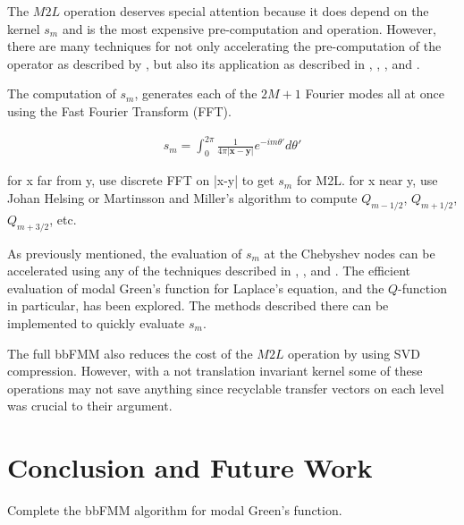 \documentclass[11pt, oneside]{article}   	%
\begin{document}
The $M2L$ operation deserves special attention because it does depend on the kernel $s_m$ and is the most expensive pre-computation and operation. However, there are many techniques for not only accelerating the pre-computation of the operator as described by \cite{FD}, but also its application as described in \cite{A}, \cite{CGMR}, \cite{FD}, and \cite{MR}.

The computation of $s_m$, generates each of the $2M+1$ Fourier modes all at once using the Fast Fourier Transform (FFT).

\begin{align}
s_m = \int_0^{2\pi} \frac{1}{4\pi|\mathbf{x}-\mathbf{y}|}e^{-im\theta'}d\theta'
\end{align}

for x far from y, use discrete FFT on |x-y| to get $s_m$ for M2L. for x near y, use Johan Helsing or Martinsson and Miller's algorithm to compute $Q_{m-1/2}$, $Q_{m+1/2}$, $Q_{m+3/2}$, etc.

As previously mentioned, the evaluation of $s_m$ at the Chebyshev nodes can be accelerated using any of the techniques described in \cite{A}, \cite{VBT}, and \cite{YFC}. The efficient evaluation of modal Green's function for Laplace's equation, and the $Q$-function in particular, has been explored. The methods described there can be implemented to quickly evaluate $s_m$.

The full bbFMM also reduces the cost of the $M2L$ operation by using SVD compression. However, with a not translation invariant kernel some of these operations may not save anything since recyclable transfer vectors on each level was crucial to their argument.

\section{Conclusion and Future Work}
Complete the bbFMM algorithm for modal Green's function.
\end{document}

